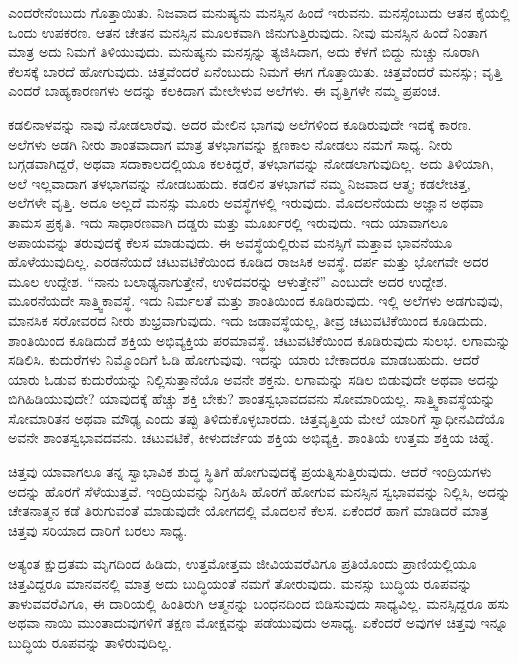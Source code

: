 ಎಂದರೇನೆಂಬುದು ಗೊತ್ತಾಯಿತು. ನಿಜವಾದ ಮನುಷ್ಯನು ಮನಸ್ಸಿನ ಹಿಂದೆ ಇರುವನು. ಮನಸ್ಸೆಂಬುದು ಆತನ ಕೈಯಲ್ಲಿ ಒಂದು ಉಪಕರಣ. ಆತನ ಚೇತನ ಮನಸ್ಸಿನ ಮೂಲಕವಾಗಿ ಜಿನುಗುತ್ತಿರುವುದು. ನೀವು ಮನಸ್ಸಿನ ಹಿಂದೆ ನಿಂತಾಗ ಮಾತ್ರ ಅದು ನಿಮಗೆ ತಿಳಿಯುವುದು. ಮನುಷ್ಯನು ಮನಸ್ಸನ್ನು ತ್ಯಜಿಸಿದಾಗ, ಅದು ಕೆಳಗೆ ಬಿದ್ದು ನುಚ್ಚು ನೂರಾಗಿ ಕೆಲಸಕ್ಕೆ ಬಾರದೆ ಹೋಗುವುದು. ಚಿತ್ತವೆಂದರೆ ಏನೆಂಬುದು ನಿಮಗೆ ಈಗ ಗೊತ್ತಾಯಿತು. ಚಿತ್ತವೆಂದರೆ ಮನಸ್ಸು; ವೃತ್ತಿ ಎಂದರೆ ಬಾಹ್ಯಕಾರಣಗಳು ಅದನ್ನು ಕಲಕಿದಾಗ ಮೇಲೇಳುವ ಅಲೆಗಳು. ಈ ವೃತ್ತಿಗಳೇ ನಮ್ಮ ಪ್ರಪಂಚ. 

ಕಡಲಿನಾಳವನ್ನು ನಾವು ನೋಡಲಾರೆವು. ಅದರ ಮೇಲಿನ ಭಾಗವು ಅಲೆಗಳಿಂದ ಕೂಡಿರುವುದೇ ಇದಕ್ಕೆ ಕಾರಣ. ಅಲೆಗಳು ಅಡಗಿ ನೀರು ಶಾಂತವಾದಾಗ ಮಾತ್ರ ತಳಭಾಗವನ್ನು ಕ್ಷಣಕಾಲ ನೋಡಲು ನಮಗೆ ಸಾಧ್ಯ. ನೀರು ಬಗ್ಗಡವಾಗಿದ್ದರೆ, ಅಥವಾ ಸದಾಕಾಲದಲ್ಲಿಯೂ ಕಲಕಿದ್ದರೆ, ತಳಭಾಗವನ್ನು ನೋಡಲಾಗುವುದಿಲ್ಲ. ಅದು ತಿಳಿಯಾಗಿ, ಅಲೆ ಇಲ್ಲವಾದಾಗ ತಳಭಾಗವನ್ನು ನೋಡಬಹುದು. ಕಡಲಿನ ತಳಭಾಗವೆ ನಮ್ಮ ನಿಜವಾದ ಆತ್ಮ; ಕಡಲೇಚಿತ್ತ, ಅಲೆಗಳೇ ವೃತ್ತಿ. ಅದೂ ಅಲ್ಲದೆ ಮನಸ್ಸು ಮೂರು ಅವಸ್ಥೆಗಳಲ್ಲಿ ಇರುವುದು. ಮೊದಲನೆಯದು ಅಜ್ಞಾನ ಅಥವಾ ತಾಮಸ ಪ್ರಕೃತಿ. ಇದು ಸಾಧಾರಣವಾಗಿ ದಡ್ಡರು ಮತ್ತು ಮೂರ್ಖರಲ್ಲಿ ಇರುವುದು. ಇದು ಯಾವಾಗಲೂ ಅಪಾಯವನ್ನು ತರುವುದಕ್ಕೆ ಕೆಲಸ ಮಾಡುವುದು. ಈ ಅವಸ್ಥೆಯಲ್ಲಿರುವ ಮನಸ್ಸಿಗೆ ಮತ್ತಾವ ಭಾವನೆಯೂ ಹೊಳೆಯುವುದಿಲ್ಲ. ಎರಡನೆಯದೆ ಚಟುವಟಿಕೆಯಿಂದ ಕೂಡಿದ ರಾಜಸಿಕ ಅವಸ್ಥೆ. ದರ್ಪ ಮತ್ತು ಭೋಗವೇ ಅದರ ಮೂಲ ಉದ್ದೇಶ. “ನಾನು ಬಲಾಢ್ಯನಾಗುತ್ತೇನೆ, ಉಳಿದವರನ್ನು ಆಳುತ್ತೇನೆ” ಎಂಬುದೇ ಅದರ ಉದ್ದೇಶ. ಮೂರನೆಯದೇ ಸಾತ್ತ್ವಿಕಾವಸ್ಥೆ. ಇದು ನಿರ್ಮಲತೆ ಮತ್ತು ಶಾಂತಿಯಿಂದ ಕೂಡಿರುವುದು. ಇಲ್ಲಿ ಅಲೆಗಳು ಅಡಗುವುವು, ಮಾನಸಿಕ ಸರೋವರದ ನೀರು ಶುಭ್ರವಾಗುವುದು. ಇದು ಜಡಾವಸ್ಥೆಯಲ್ಲ, ತೀವ್ರ ಚಟುವಟಿಕೆಯಿಂದ ಕೂಡಿದುದು. ಶಾಂತಿಯಿಂದ ಕೂಡಿದುದೆ ಶಕ್ತಿಯ ಅಭಿವ್ಯಕ್ತಿಯ ಪರಮಾವಸ್ಥೆ. ಚಟುವಟಿಕೆಯಿಂದ ಕೂಡಿರುವುದು ಸುಲಭ. ಲಗಾಮನ್ನು ಸಡಿಲಿಸಿ. ಕುದುರೆಗಳು ನಿಮ್ಮೊಂದಿಗೆ ಓಡಿ ಹೋಗುವುವು. ಇದನ್ನು ಯಾರು ಬೇಕಾದರೂ ಮಾಡಬಹುದು. ಆದರೆ ಯಾರು ಓಡುವ ಕುದುರೆಯನ್ನು ನಿಲ್ಲಿಸುತ್ತಾನೆಯೊ ಅವನೇ ಶಕ್ತನು. ಲಗಾಮನ್ನು ಸಡಿಲ ಬಿಡುವುದೇ ಅಥವಾ ಅದನ್ನು ಬಿಗಿಹಿಡಿಯುವುದೇ? ಯಾವುದಕ್ಕೆ ಹೆಚ್ಚು ಶಕ್ತಿ ಬೇಕು? ಶಾಂತಸ್ವಭಾವದವನು ಸೋಮಾರಿಯಲ್ಲ. ಸಾತ್ತ್ವಿಕಾವಸ್ಥೆಯನ್ನು ಸೋಮಾರಿತನ ಅಥವಾ ಮೌಢ್ಯ ಎಂದು ತಪ್ಪು ತಿಳಿದುಕೊಳ್ಳಬಾರದು. ಚಿತ್ತವೃತ್ತಿಯ ಮೇಲೆ ಯಾರಿಗೆ ಸ್ವಾಧೀನವಿದೆಯೊ ಅವನೇ ಶಾಂತಸ್ವಭಾವದವನು. ಚಟುವಟಿಕೆ, ಕೀಳುದರ್ಜೆಯ ಶಕ್ತಿಯ ಅಭಿವ್ಯಕ್ತಿ. ಶಾಂತಿಯೆ ಉತ್ತಮ ಶಕ್ತಿಯ ಚಿಹ್ನೆ. 

ಚಿತ್ತವು ಯಾವಾಗಲೂ ತನ್ನ ಸ್ವಾಭಾವಿಕ ಶುದ್ಧ ಸ್ಥಿತಿಗೆ ಹೋಗುವುದಕ್ಕೆ ಪ್ರಯತ್ನಿಸುತ್ತಿರುವುದು. ಆದರೆ ಇಂದ್ರಿಯಗಳು ಅದನ್ನು ಹೊರಗೆ ಸೆಳೆಯುತ್ತವೆ. ಇಂದ್ರಿಯವನ್ನು ನಿಗ್ರಹಿಸಿ ಹೊರಗೆ ಹೋಗುವ ಮನಸ್ಸಿನ ಸ್ವಭಾವವನ್ನು ನಿಲ್ಲಿಸಿ, ಅದನ್ನು ಚೇತನಾತ್ಮನ ಕಡೆ ತಿರುಗುವಂತೆ ಮಾಡುವುದೇ ಯೋಗದಲ್ಲಿ ಮೊದಲನೆ ಕೆಲಸ. ಏಕೆಂದರೆ ಹಾಗೆ ಮಾಡಿದರೆ ಮಾತ್ರ ಚಿತ್ತವು ಸರಿಯಾದ ದಾರಿಗೆ ಬರಲು ಸಾಧ್ಯ. 

ಅತ್ಯಂತ ಕ್ಷುದ್ರತಮ ಮೃಗದಿಂದ ಹಿಡಿದು, ಉತ್ತಮೋತ್ತಮ ಜೀವಿಯವರೆವಿಗೂ ಪ್ರತಿಯೊಂದು ಪ್ರಾಣಿಯಲ್ಲಿಯೂ ಚಿತ್ತವಿದ್ದರೂ ಮಾನವನಲ್ಲಿ ಮಾತ್ರ ಅದು ಬುದ್ಧಿಯಂತೆ ನಮಗೆ ತೋರುವುದು. ಮನಸ್ಸು ಬುದ್ಧಿಯ ರೂಪವನ್ನು ತಾಳುವವರೆವಿಗೂ, ಈ ದಾರಿಯಲ್ಲಿ ಹಿಂತಿರುಗಿ ಆತ್ಮನನ್ನು ಬಂಧನದಿಂದ ಬಿಡಿಸುವುದು ಸಾಧ್ಯವಿಲ್ಲ. ಮನಸ್ಸಿದ್ದರೂ ಹಸು ಅಥವಾ ನಾಯಿ ಮುಂತಾದುವುಗಳಿಗೆ ತಕ್ಷಣ ಮೋಕ್ಷವನ್ನು ಪಡೆಯುವುದು ಅಸಾಧ್ಯ. ಏಕೆಂದರೆ ಅವುಗಳ ಚಿತ್ತವು ಇನ್ನೂ ಬುದ್ಧಿಯ ರೂಪವನ್ನು ತಾಳಿರುವುದಿಲ್ಲ. 

